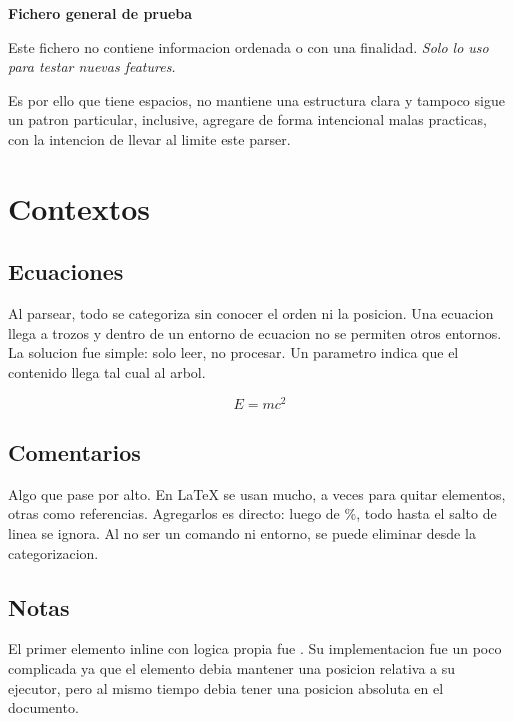\documentclass{article}
\begin{document}
  \textbf{ Fichero general de prueba }

  Este fichero no contiene informacion ordenada o con una finalidad.
  \textit { Solo lo uso para testar nuevas features. } \newline

  Es por ello que tiene espacios, no mantiene una estructura clara y tampoco
  sigue un patron particular, inclusive, agregare de forma intencional malas
  practicas, con la intencion de llevar al limite este parser.

  

  

  \chapter{ Contextos }

  \section{ Ecuaciones }

  Al parsear, todo se categoriza sin conocer el orden ni la posicion. Una ecuacion
  llega a trozos y dentro de un entorno de ecuacion no se permiten otros entornos.
  La solucion fue simple: solo leer, no procesar. Un parametro
  indica que el contenido llega tal cual al arbol.

  \begin{equation}
      E = mc^2
  \end{equation}

  \section{ Comentarios }

  Algo que pase por alto. En LaTeX se usan mucho, a veces para quitar elementos,
  otras como referencias. Agregarlos es directo: luego de \%, todo hasta el
  salto de linea se ignora. Al no ser un comando ni entorno, se puede eliminar
  desde la categorizacion.

  \section{ Notas }

  El primer elemento inline con logica propia fue
  .
  Su implementacion fue un poco complicada ya que el elemento debia mantener
  una posicion relativa a su ejecutor, pero al mismo tiempo debia tener una
  posicion absoluta en el documento.
\end{document}
